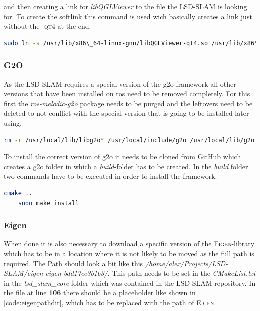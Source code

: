 and then creating a link for \textit{libQGLViewer} to the file the LSD-SLAM is looking for. To create the softlink this command is used wich basically creates a link just without the \textsc{-qt4} at the end.\newline
\begin{lstlisting}[language=bash,caption={Creating softlink for libQGLViewer.so}]
    sudo ln -s /usr/lib/x86\_64-linux-gnu/libQGLViewer-qt4.so /usr/lib/x86\_64-linux-gnu/libQGLViewer.so
\end{lstlisting}

\subsubsection{G2O}\label{ref:g2o}
As the LSD-SLAM requires a special version of the \gls{g2o} framework all other versions that have been installed on \gls{ros} need to be removed completely. For this first the \textit{ros-melodic-g2o} package needs to be purged and the leftovers need to be deleted to not conflict with the special version that is going to be installed later using.\newline
\begin{lstlisting}[language=bash, caption={Removing leftover from \gls{g2o}}]
    rm -r /usr/local/lib/libg2o* /usr/local/include/g2o /usr/local/lib/g2o /usr/local/bin/g2o*
\end{lstlisting}

To install the correct version of \gls{g2o} it needs to be cloned from \href{https://github.com/felixendres/g2o.git}{GitHub} \cite{g2ofelixendres} which creates a g2o folder in which a \textit{build}-folder has to be created. In the \textit{build} folder two commands have to be executed in order to install the framework.\newline
\begin{lstlisting}[language=bash]
    cmake ..
    sudo make install
\end{lstlisting}

\subsubsection{Eigen}\label{ref:eigen}
When done it is also necessary to download a specific version of the \textsc{Eigen}-library which has to be in a location where it is not likely to be moved as the full path is required. The Path should look a bit like this \textit{/home/alex/Projects/LSD-SLAM/eigen-eigen-bdd17ee3b1b3/}. This path needs to be set in the \textit{CMakeList.txt} in the \textit{lsd\_slam\_core} folder which was contained in the LSD-SLAM repository. In the file at line \textbf{106} there should be a placeholder like shown in \ref{code:eigenpathdir}, which has to be replaced with the path of \textsc{Eigen}.\newline


